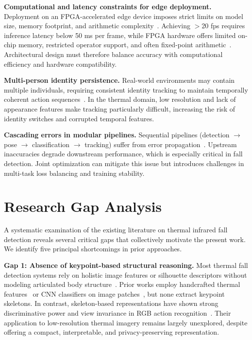 \textbf{Computational and latency constraints for edge deployment.} Deployment on an FPGA-accelerated edge device imposes strict limits on model size, memory footprint, and arithmetic complexity~\cite{sze2017efficient,chen2019drop}. Achieving $>$20 fps requires inference latency below 50 ms per frame, while FPGA hardware offers limited on-chip memory, restricted operator support, and often fixed-point arithmetic~\cite{guo2019survey}. Architectural design must therefore balance accuracy with computational efficiency and hardware compatibility.

\textbf{Multi-person identity persistence.} Real-world environments may contain multiple individuals, requiring consistent identity tracking to maintain temporally coherent action sequences~\cite{bewley2016simple,zhang2022bytetrack}. In the thermal domain, low resolution and lack of appearance features make tracking particularly difficult, increasing the risk of identity switches and corrupted temporal features.

\textbf{Cascading errors in modular pipelines.} Sequential pipelines (detection $\rightarrow$ pose $\rightarrow$ classification $\rightarrow$ tracking) suffer from error propagation~\cite{cao2017realtime}. Upstream inaccuracies degrade downstream performance, which is especially critical in fall detection. Joint optimization can mitigate this issue but introduces challenges in multi-task loss balancing and training stability.

\section{Research Gap Analysis}
\label{sec:intro_gap}

A systematic examination of the existing literature on thermal infrared fall detection reveals several critical gaps that collectively motivate the present work. We identify five principal shortcomings in prior approaches.

\textbf{Gap 1: Absence of keypoint-based structural reasoning.} 
Most thermal fall detection systems rely on holistic image features or silhouette descriptors without modeling articulated body structure~\cite{nogas2020fall,vadivelu2016thermal}. Prior works employ handcrafted thermal features~\cite{mashiyama2015activity} or CNN classifiers on image patches~\cite{nogas2020fall}, but none extract keypoint skeletons. In contrast, skeleton-based representations have shown strong discriminative power and view invariance in RGB action recognition~\cite{yan2018spatial,shi2019two}. Their application to low-resolution thermal imagery remains largely unexplored, despite offering a compact, interpretable, and privacy-preserving representation.


